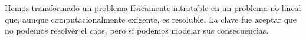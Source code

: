 \begin{center}
\end{center}
Hemos transformado un problema físicamente intratable en un problema no lineal que, aunque computacionalmente exigente, es resoluble. La clave fue aceptar que no podemos resolver el caos, pero sí podemos modelar sus consecuencias.